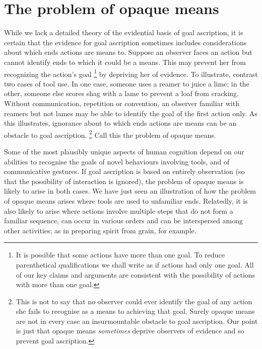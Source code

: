 \documentclass[14pt,a4paper]{extarticle}
\begin{document}
\section{The problem of opaque means}
\label{sec:opaque_means}

While we lack a detailed theory of the evidential basis of goal ascription,
it is certain that the evidence for goal ascription sometimes includes considerations about which ends actions are means to.
Suppose an observer faces an action but cannot identify ends to which it could be a means.
This may prevent her from recognizing the action's goal%
\footnote{
It is possible that some actions have more than one goal.
To reduce parenthetical qualifications we shall write as if actions had only one goal.  
All of our key claims and arguments are consistent with the possibility of actions with more than one goal.
} 
 by depriving her of evidence.
To illustrate, contrast two cases of tool use.
In one case, someone uses a reamer to  juice  a lime; in the other, someone else scores shag with a lame to prevent a loaf from cracking.
Without communication, repetition or convention,
an observer familiar with reamers but not lames 
may be able to identify the goal of the first action only.
As this illustrates, ignorance about to which ends actions are means can be an obstacle to goal ascription.%
\footnote{
This is not to say that no observer could ever identify the goal of any action she fails to recognise as a means to achieving that goal.
Surely opaque means are not in every case an insurmountable obstacle to goal ascription.
Our point is just that opaque means \emph{sometimes}  deprive observers of evidence and so prevent goal ascription.
}
Call this the problem of opaque means.

Some of the most plausibly unique aspects of human cognition depend on our abilities to recognise the goals of novel behaviours involving tools, and of communicative gestures.
If goal ascription is based on entirely observation 
(so that the possibility of interaction is ignored),
the problem of opaque means is likely to arise in both cases.
We have just seen an illustration of how the problem of opaque means arises where tools are used to unfamiliar ends.
Relatedly, it is also likely to arise where actions involve multiple steps that do not form a familiar sequence, can occur in various orders and can be interspersed among other activities;
as in preparing spirit from grain, for example.
\end{document}
